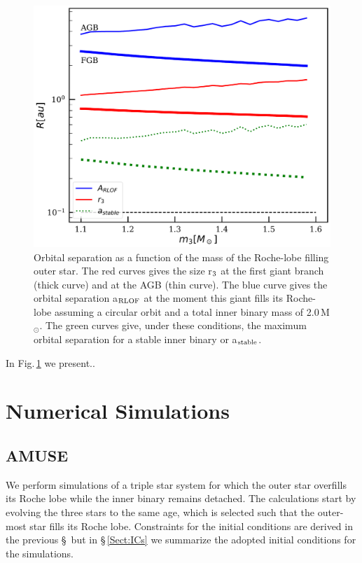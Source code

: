 \documentclass{aastex62}
\newcommand{\MSun}{\mbox{M$_\odot$}}
\begin{document}
\begin{figure}[ht!]
  \includegraphics[width=\columnwidth]{fig_minimumstablesize.pdf}
\caption{Orbital separation as a function of the mass of the
  Roche-lobe filling outer star. The red curves gives the size r$_{\rm 3}$ at the
  first giant branch (thick curve) and at the AGB (thin curve). The
  blue curve gives the orbital separation a$_{\rm RLOF}$ at the moment this giant fills its
  Roche-lobe assuming a circular orbit and a total inner binary mass
  of 2.0\,\MSun. The green curves give, under these conditions, the
  maximum orbital separation for a stable inner binary or a$_{\rm stable}$.
\label{fig:tertiarymass_vs_size}}
\end{figure}

In Fig.\,\ref{fig:tertiarymass_vs_size} we present..

\section{Numerical Simulations} \label{sims}

\subsection{AMUSE} \label{amuse}

We perform simulations of a triple star system for which the outer star
overfills its Roche lobe while the inner binary remains detached. The
calculations start by evolving the three stars to the same age, which
is selected such that the outer-most star fills its Roche lobe.
Constraints for the initial conditions are derived in the previous
\S\, but in \S\,\ref{Sect:ICs} we summarize the adopted initial
conditions for the simulations.
\end{document}
